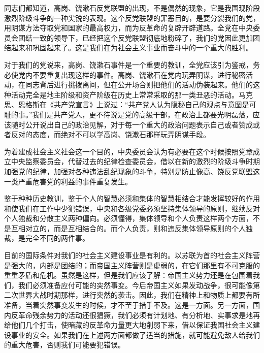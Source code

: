 同志们都知道，高岗、饶漱石反党联盟的出现，不是偶然的现象，它是我国现阶段激烈阶级斗争的一种尖锐的表现。这个反党联盟的罪恶目的，是要分裂我们的党，用阴谋方法夺取党和国家的最高权力，而为反革命的复辟开辟道路。全党在中央委员会团结一致的领导下，已经把这个反党联盟彻底地粉碎了，我们的党因此更加团结起来和巩固起来了。这是我们在为社会主义事业而奋斗中的一个重大的胜利。

对于我们的党说来，高岗、饶漱石事件是一个重要的教训，全党应该引为鉴戒，务必使党内不要重复出现这样的事件。高岗、饶漱石在党内玩弄阴谋，进行秘密活动，在同志背后进行挑拨离间，但在公开场合则把他们的活动伪装起来。他们的这种活动完全是地主阶级和资产阶级在历史上常常采取的那一类丑恶的活动。马克思、恩格斯在《共产党宣言》上说过：“共产党人认为隐秘自己的观点与意图是可耻的事。”我们是共产党人，更不待说是党的高级干部，在政治上都要光明磊落，应该随时公开说出自己的政治见解，对于每一个重大的政治问题表示自己或者赞成或者反对的态度，而绝对不可以学高岗、饶漱石那样玩弄阴谋手段。

为着建成社会主义社会这一个目的，中央委员会认为有必要在这个时候按照党章成立中央监察委员会，代替过去的纪律检查委员会，借以在新的激烈的阶级斗争时期加强党的纪律，加强对各种违法乱纪现象的斗争，特别是防止像高、饶反党联盟这一类严重危害党的利益的事件重复发生。

鉴于种种历史教训，鉴于个人的智慧必须和集体的智慧相结合才能发挥较好的作用和使我们在工作中少犯错误，中央和各级党委必须坚持集体领导的原则，继续反对个人独裁和分散主义两种偏向。必须懂得，集体领导和个人负责这样两个方面，不是互相对立的，而是互相结合的。而个人负责，则和违反集体领导原则的个人独裁，是完全不同的两件事。

目前的国际条件对我们的社会主义建设事业是有利的。以苏联为首的社会主义阵营是强大的，内部是团结的；而帝国主义阵营则是虚弱的，在它们那里有不可克服的重重矛盾和危机。虽然是这样，但是我们应该了解：帝国主义势力还是在包围着我们，我们必须准备应付可能的突然事变。今后帝国主义如果发动战争，很可能像第二次世界大战时期那样，进行突然的袭击。因此，我们在精神上和物质上都要有所准备，当着突然事变发生的时候，才不至于措手不及。这是一方面。另一方面，国内反革命残余势力的活动还很猖獗，我们必须有计划地、有分析地、实事求是地再给他们几个打击，使暗藏的反革命力量更大地削弱下来，借以保证我国社会主义建设事业的安全。如果我们在上述两方面都做了适当的措施，就可能避免敌人给我们的重大危害，否则我们可能要犯错误。

